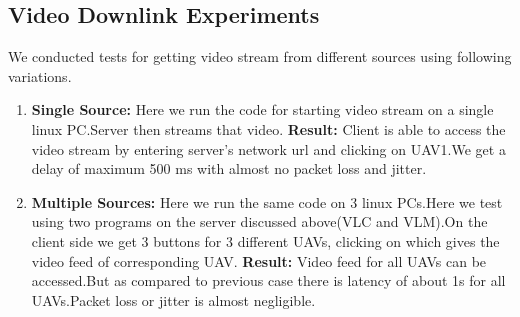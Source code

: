 \documentclass[12pt]{article}
\begin{document}
\subsection{Video Downlink Experiments}
We conducted tests for getting video stream from different sources using following variations.
\begin{enumerate}
\item {\bf Single Source:} Here we run the code for starting video stream on a single linux PC.Server then streams that video.\newline
{\bf Result: }Client is able to access the video stream by entering server's network url and clicking on UAV1.We get a delay of maximum 500 ms with almost no packet loss and jitter.\newline
\item {\bf Multiple Sources: }Here we run the same code on 3 linux PCs.Here we test using two programs on the server discussed above(VLC and VLM).On the client side we get 3 buttons for 3 different UAVs, clicking on which gives the video feed of corresponding UAV.
\newline
{\bf Result:} Video feed for all UAVs can be accessed.But as compared to previous case there is latency of about 1s for all UAVs.Packet loss or jitter is almost negligible.
\end{enumerate}
\end{document}
